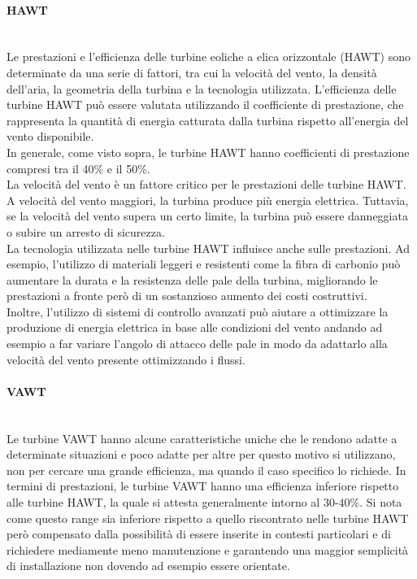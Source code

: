 \paragraph{HAWT}\mbox{}\\
Le prestazioni e l'efficienza delle turbine eoliche a elica orizzontale (HAWT) sono determinate da una serie di fattori, tra cui la velocità del vento, la densità dell'aria, la geometria della turbina e la tecnologia utilizzata.
L'efficienza delle turbine HAWT può essere valutata utilizzando il coefficiente di prestazione, che rappresenta la quantità di energia catturata dalla turbina rispetto all'energia del vento disponibile.\\
In generale, come visto sopra, le turbine HAWT hanno coefficienti di prestazione compresi tra il 40\% e il 50\%.\\
La velocità del vento è un fattore critico per le prestazioni delle turbine HAWT. A velocità del vento maggiori, la turbina produce più energia elettrica. Tuttavia, se la velocità del vento supera un certo limite, la turbina può essere danneggiata o subire un arresto di sicurezza.\\
La tecnologia utilizzata nelle turbine HAWT influisce anche sulle prestazioni. Ad esempio, l'utilizzo di materiali leggeri e resistenti come la fibra di carbonio può aumentare la durata e la resistenza delle pale della turbina, migliorando le prestazioni a fronte però di un sostanzioso aumento dei costi costruttivi.\\
Inoltre, l'utilizzo di sistemi di controllo avanzati può aiutare a ottimizzare la produzione di energia elettrica in base alle condizioni del vento andando ad esempio a far variare l'angolo di attacco delle pale in modo da adattarlo alla velocità del vento presente ottimizzando i flussi.
\paragraph{VAWT}\mbox{}\\
Le turbine VAWT hanno alcune caratteristiche uniche che le rendono adatte a determinate situazioni e poco adatte per altre per questo motivo si utilizzano, non per cercare una grande efficienza, ma quando il caso specifico lo richiede.
In termini di prestazioni, le turbine VAWT hanno una efficienza inferiore rispetto alle turbine HAWT, la quale si attesta generalmente intorno al 30-40\%.
Si nota come questo range sia inferiore rispetto a quello riscontrato nelle turbine HAWT però compensato dalla possibilità di essere inserite in contesti particolari e di richiedere mediamente meno manutenzione e garantendo una maggior semplicità di installazione non dovendo ad esempio essere orientate.
\newpage

